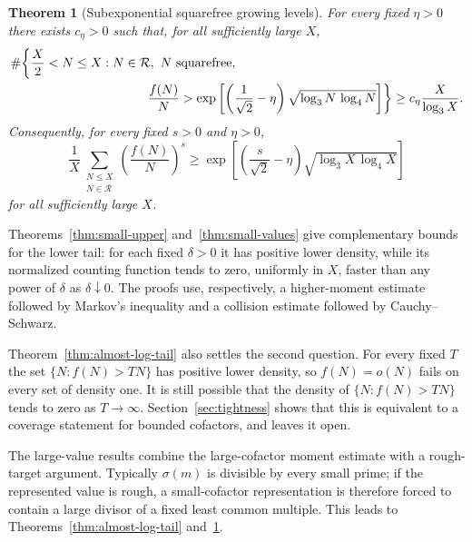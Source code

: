 \documentclass[11pt]{article}
\newtheorem{theorem}{Theorem}[section]
\theoremstyle{remark}
\newcommand{\N}{\mathbb N}
\newcommand{\Rcal}{\mathcal R}
\newcommand{\1}{\mathbf 1}
\begin{document}
\begin{theorem}[Subexponential squarefree growing levels]
\label{thm:subexp-growth}
For every fixed $\eta>0$ there exists $c_\eta>0$ such that, for all
sufficiently large $X$,
\begin{equation}\label{eq:subexp-growth}
\begin{aligned}
 &\#\biggl\{\frac X2<N\leq X:
       N\in\Rcal,\ N\text{ squarefree},\\
 &\hspace{38mm}
       \frac{f(N)}N>
       \exp\left[
         \left(\frac1{\sqrt2}-\eta\right)
         \sqrt{\log_3N\,\log_4N}
       \right]\biggr\}
 \geq c_\eta\frac X{\log_3X}.
\end{aligned}
\end{equation}
Consequently, for every fixed $s>0$ and $\eta>0$,
\begin{equation}\label{eq:positive-moment-growth}
 \frac1X\sum_{\substack{N\leq X\\N\in\Rcal}}
       \left(\frac{f(N)}N\right)^s
 \geq
 \exp\left[
       \left(\frac{s}{\sqrt2}-\eta\right)
       \sqrt{\log_3X\,\log_4X}
      \right]
\end{equation}
for all sufficiently large $X$.
\end{theorem}

Theorems~\ref{thm:small-upper} and~\ref{thm:small-values} give complementary
bounds for the lower tail: for each fixed $\delta>0$ it has positive lower
density, while its normalized counting function tends to zero, uniformly in
$X$, faster than any power of $\delta$ as $\delta\downarrow0$.  The proofs use,
respectively, a higher-moment estimate followed by Markov's inequality and a
collision estimate followed by Cauchy--Schwarz.

Theorem~\ref{thm:almost-log-tail} also settles the second question.  For
every fixed $T$ the set $\{N:f(N)>TN\}$ has positive lower density, so
$f(N)=o(N)$ fails on every set of density one.  It is still possible that
the density of $\{N:f(N)>TN\}$ tends to zero as $T\to\infty$.
Section~\ref{sec:tightness} shows that this is equivalent to a coverage
statement for bounded cofactors, and leaves it open.

The large-value results combine the large-cofactor moment estimate with a
rough-target argument.  Typically $\sigma(m)$ is divisible by every small
prime; if the represented value is rough, a small-cofactor representation is
therefore forced to contain a large divisor of a fixed least common multiple.
This leads to Theorems~\ref{thm:almost-log-tail} and~\ref{thm:subexp-growth}.
\end{document}
